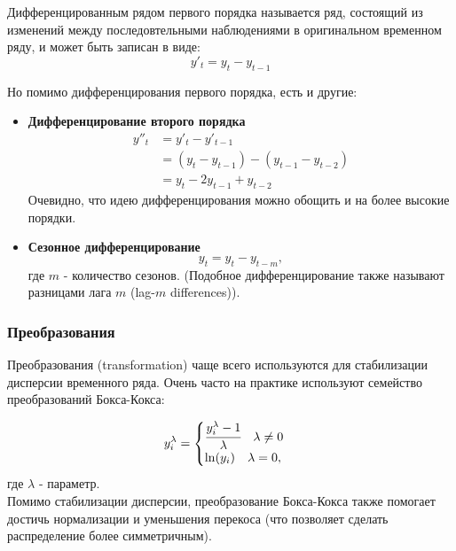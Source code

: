 Дифференцированным рядом первого порядка называется ряд, состоящий из 
изменений между последовтельными 
наблюдениями в оригинальном временном ряду, и может быть записан в виде:
\begin{equation*}
    y'_t = y_t - y_{t-1}
\end{equation*} 

Но помимо дифференцирования первого порядка, есть и другие:
\begin{itemize}
    \item \textbf{Дифференцирование второго порядка}
    \begin{align*}
        y''_t &= y'_t - y'_{t-1}  \\
        &= (y_t - y_{t-1}) - (y_{t-1} - y_{t-2})  \\
        &= y_t - 2 y_{t-1} + y_{t-2}
    \end{align*}
    Очевидно, что идею дифференцирования можно обощить и на более 
    высокие порядки.
    \item \textbf{Сезонное дифференцирование}
    \begin{equation*}
        y_t = y_t - y_{t-m},
    \end{equation*}
    где $m$ - количество сезонов. (Подобное дифференцирование также называют 
    \guillemotleft разницами лага $m$\guillemotright {} (lag-$m$ differences)).
\end{itemize} 

\subsubsection{Преобразования}

Преобразования (transformation) чаще всего используются для стабилизации 
дисперсии временного ряда. Очень часто на практике используют семейство 
преобразований Бокса-Кокса:

\begin{equation*}
    y_i^{\lambda} = \begin{cases}
        \cfrac{y_i^{\lambda} - 1}{\lambda} \quad \lambda \neq 0 \\
    \ln(y_i) \quad \lambda = 0,
    \end{cases}
\end{equation*}
где $\lambda$ - параметр. \\

Помимо стабилизации дисперсии, преобразование Бокса-Кокса также помогает 
достичь нормализации и уменьшения перекоса (что позволяет сделать 
распределение более симметричным).\\


